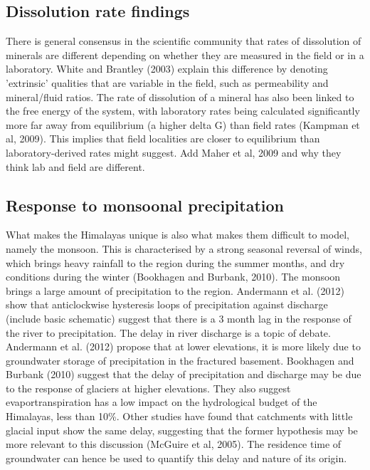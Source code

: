 \subsection{Dissolution rate findings}

There is general consensus in the scientific community that rates of dissolution of minerals are different depending on whether they are measured in the field or in a laboratory. White and Brantley (2003) explain this difference by denoting 'extrinsic' qualities that are variable in the field, such as permeability and mineral/fluid ratios. The rate of dissolution of a mineral has also been linked to the free energy of the system, with laboratory rates being calculated significantly more far away from equilibrium (a higher delta G) than field rates (Kampman et al, 2009). This implies that field localities are closer to equilibrium than laboratory-derived rates might suggest. Add Maher et al, 2009 and why they think lab and field are different.

\subsection{Response to monsoonal precipitation}
What makes the Himalayas unique is also what makes them difficult to model, namely the monsoon. This is characterised by a strong seasonal reversal of winds, which brings heavy rainfall to the region during the summer months, and dry conditions during the winter (Bookhagen and Burbank, 2010). The monsoon brings a large amount of precipitation to the region. Andermann et al. (2012) show that anticlockwise hysteresis loops of precipitation against discharge (include basic schematic) suggest that there is a 3 month lag in the response of the river to precipitation.  The delay in river discharge is a topic of debate. Andermann et al. (2012) propose that at lower elevations, it is more likely due to groundwater storage of precipitation in the fractured basement. Bookhagen and Burbank (2010) suggest that the delay of precipitation and discharge may be due to the response of glaciers at higher elevations. They also suggest evaportranspiration has a low impact on the hydrological budget of the Himalayas, less than 10\%. Other studies have found that catchments with little glacial input show the same delay, suggesting that the former hypothesis may be more relevant to this discussion (McGuire et al, 2005). The residence time of groundwater can hence be used to quantify this delay and nature of its origin.



